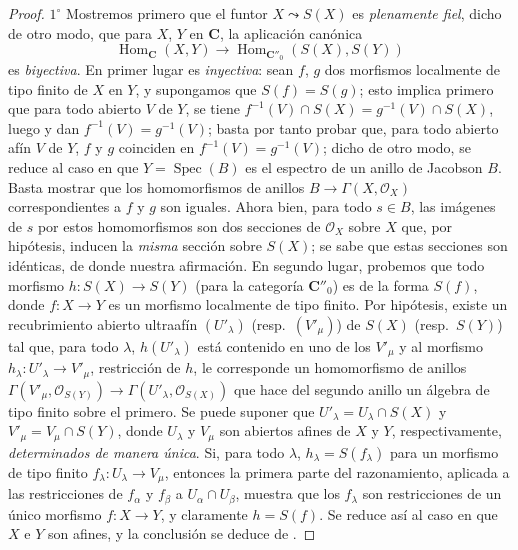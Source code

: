 \begin{proof}
$1^\circ$ Mostremos primero que el funtor $X\leadsto S(X)$ es \emph{plenamente fiel}, dicho de otro modo, que para $X$, $Y$ en $\boldsymbol{C}$, la aplicación canónica
\[
  \operatorname{Hom}_{\mathbf C}(X,Y)\longrightarrow
  \operatorname{Hom}_{\mathbf C''_0}(S(X),S(Y))
\]
es \emph{biyectiva}.
En primer lugar es \emph{inyectiva}: sean $f$, $g$ dos morfismos localmente de tipo finito de $X$ en $Y$, y supongamos que $S(f)=S(g)$; esto implica primero que para todo abierto $V$ de $Y$, se tiene $f^{-1}(V)\cap S(X)=g^{-1}(V)\cap S(X)$, luego  y  dan $f^{-1}(V)=g^{-1}(V)$; basta por tanto probar que, para todo abierto afín $V$ de $Y$, $f$ y $g$ coinciden en $f^{-1}(V)=g^{-1}(V)$; dicho de otro modo, se reduce al caso en que $Y=\operatorname{Spec}(B)$ es el espectro de un anillo de Jacobson $B$.
Basta  mostrar que los homomorfismos de anillos $B\to\Gamma(X,\mathcal O_X)$ correspondientes a $f$ y $g$ son iguales.
Ahora bien, para todo $s\in B$, las imágenes de $s$ por estos homomorfismos son dos secciones de $\mathcal O_X$ sobre $X$ que, por hipótesis, inducen la \emph{misma} sección sobre $S(X)$; se sabe  que estas secciones son idénticas, de donde nuestra afirmación.
En segundo lugar, probemos que todo morfismo $h:S(X)\to S(Y)$ (para la categoría $\boldsymbol{C}''_0$) es de la forma $S(f)$, donde $f:X\to Y$ es un morfismo localmente de tipo finito.
Por hipótesis, existe un recubrimiento abierto ultraafín $(U'_\lambda)$ (resp.\ $(V'_\mu)$) de $S(X)$ (resp.\ $S(Y)$) tal que, para todo $\lambda$, $h(U'_\lambda)$ está contenido en uno de los $V'_\mu$ y al morfismo $h_\lambda:U'_\lambda\to V'_\mu$, restricción de $h$, le corresponde un homomorfismo de anillos
$\Gamma(V'_\mu,\mathcal O_{S(Y)})\to
\Gamma(U'_\lambda,\mathcal O_{S(X)})$ que hace del segundo anillo un álgebra de tipo finito sobre el primero.
Se puede suponer que $U'_\lambda=U_\lambda\cap S(X)$ y $V'_\mu=V_\mu\cap S(Y)$, donde $U_\lambda$ y $V_\mu$ son abiertos afines de $X$ y $Y$, respectivamente, \emph{determinados de manera única}. Si, para todo $\lambda$, $h_\lambda=S(f_\lambda)$ para un morfismo de tipo finito $f_\lambda:U_\lambda\to V_\mu$, entonces la primera parte del razonamiento, aplicada a las restricciones de $f_\alpha$ y $f_\beta$ a $U_\alpha\cap U_\beta$, muestra que los $f_\lambda$ son restricciones de un único morfismo $f:X\to Y$, y claramente $h=S(f)$. Se reduce así al caso en que $X$ e $Y$ son afines, y la conclusión se deduce de .


\end{proof}
